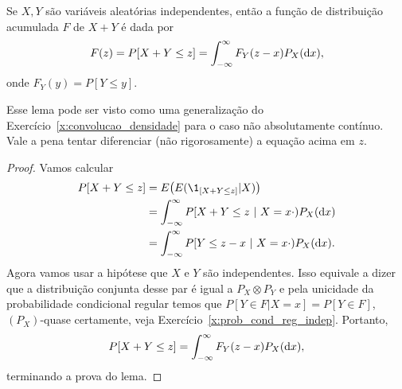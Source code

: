 \begin{proposition}
  Se $X, Y$ são variáveis aleatórias independentes, então a função de distribuição acumulada $F$ de $X + Y$ é dada por
  \begin{equation}
    F(z) = P[X + Y \leq z] = \int_{-\infty}^\infty F_Y(z - x) P_X (\mathop{}\!\mathrm{d} x),
  \end{equation}
  onde $F_Y(y) = P[Y \leq y]$.
\end{proposition}

Esse lema pode ser visto como uma generalização do Exercício~\ref{x:convolucao_densidade} para o caso não absolutamente contínuo.
Vale a pena tentar diferenciar (não rigorosamente) a equação acima em $z$.

\begin{proof}
  Vamos calcular
  \begin{equation}
    \begin{split}
      P[X + Y \leq z] & = E\big( E(\1_{[X + Y \leq z]} | X) \big)\\
      & = \int_{-\infty}^\infty P[X + Y \leq z \ | \ X = x\cdot) P_X(\dd x)\\
      & = \int_{-\infty}^\infty P[ Y \leq z-x  \ | \ X = x\cdot) P_X(\dd x).
     \end{split}
  \end{equation}
  Agora vamos usar a hipótese que $X$ e $Y$ são independentes.
  Isso equivale a dizer que a distribuição conjunta desse par é igual a $P_X \otimes P_Y$ e pela unicidade da probabilidade condicional regular
  temos que $P[Y \in F | X = x] = P[Y \in F]$, $(P_X)$-quase certamente, veja Exercício~\ref{x:prob_cond_reg_indep}.
  Portanto,
  \begin{equation}
    P[X + Y \leq z] = \int_{-\infty}^\infty F_Y(z - x)  P_X (\mathop{}\!\mathrm{d} x),
  \end{equation}
  terminando a prova do lema.
\end{proof}


